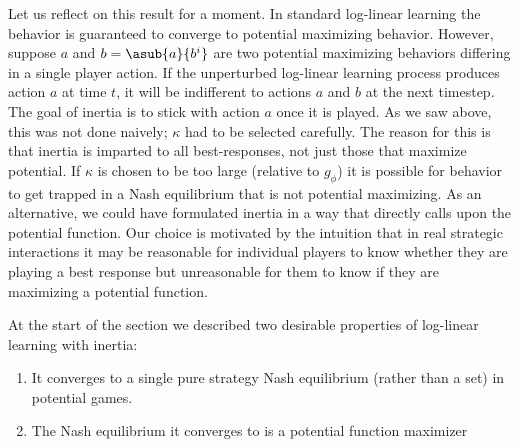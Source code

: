Let us reflect on this result for a moment. In standard log-linear learning the behavior is guaranteed to converge to potential maximizing behavior. However, suppose $a$ and $b = \asub{a}{b^i}$ are two potential maximizing behaviors differing in a single player action. If the unperturbed log-linear learning process produces action $a$ at time $t$, it will be indifferent to actions $a$ and $b$ at the next timestep. The goal of inertia is to stick with action $a$ once it is played. As we saw above, this was not done naively; $\kappa$ had to be selected carefully. The reason for this is that inertia is imparted to all best-responses, not just those that maximize potential. If $\kappa$ is chosen to be too large (relative to $g_{\phi}$) it is possible for behavior to get trapped in a Nash equilibrium that is not potential maximizing. As an alternative, we could have formulated inertia in a way that directly calls upon the potential function. Our choice is motivated by the intuition that in real strategic interactions it may be reasonable for individual players to know whether they are playing a best response but unreasonable for them to know if they are maximizing a potential function. 

At the start of the section we described two desirable properties of log-linear learning with inertia: 

\begin{enumerate}
    \item It converges to a single pure strategy Nash equilibrium (rather than a set) in potential games.
    \item The Nash equilibrium it converges to is a potential function maximizer
\end{enumerate}


